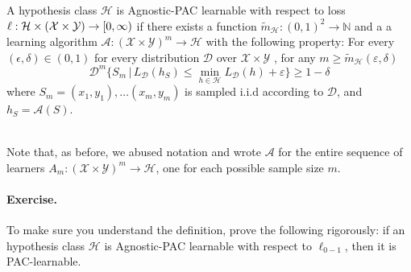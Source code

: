 \documentclass[11pt]{article}
\newcommand{\N}{\ensuremath{\mathbb{N}}}
\newcommand{\Ac}{\mathcal{A}}
\newcommand{\Dc}{\mathcal{D}}
\newcommand{\Xc}{\mathcal{X}}
\newcommand{\Yc}{\mathcal{Y}}
\newcommand{\Hc}{\mathcal{H}}
\begin{document}
\begin{definition} \label{apac:def}
    A hypothesis class $\Hc$ is Agnostic-PAC learnable with respect to
    loss $\ell:\Hc\times (\X\times \Y)\to[0,\infty)$ if there exists a function
    $\tilde{m}_\Hc:(0,1)^2\to\N$  and a
a learning algorithm $\Ac:(\Xc\times\Yc)^m\to\Hc$
with the following property: For every $(\epsilon,\delta)\in (0, 1)$ 
for every distribution $\Dc$ over $\Xc\times \Yc$ , for any $m\geq \tilde{m}_\Hc(\varepsilon,\delta)$ 
\[
    \Dc^m\{ S_m \,|\, L_{\Dc}(h_S) \leq \min_{h\in\Hc} L_\Dc(h) + \varepsilon\} \geq 1-\delta
\]
where $S_m=\left( x_1,y_1 \right),\ldots \left( x_m,y_m \right)$ is sampled
i.i.d according to $\Dc$, and $h_S=\Ac(S)$.
\end{definition}
~\\
Note that,  as before, we abused notation and wrote $\Ac$ for the entire sequence
of learners
$A_m:(\Xc\times\Yc)^m\to\Hc$, one for each possible sample size $m$.



\paragraph{Exercise.} To make sure you understand the definition, prove the
following rigorously: if 
an hypothesis class $\Hc$ is Agnostic-PAC learnable with respect to $\ell_{0-1}$, then it is PAC-learnable. 
\end{document}
